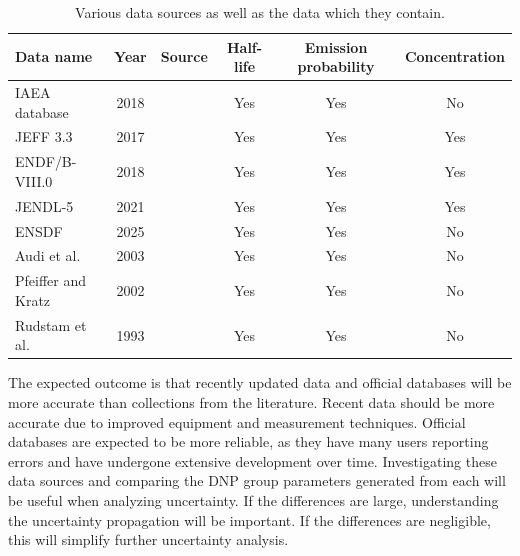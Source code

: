 \begin{table}[H]
    \centering
    \caption{Various data sources as well as the data which they contain.}
    \begin{tabular}{lccccc}
    \hline
    Data name & Year & Source & Half-life & Emission probability & Concentration\\
    \hline
      \gls{IAEA} database & 2018 & \cite{DIMITRIOU2021144} & Yes & Yes & No\\
      \gls{JEFF} 3.3 & 2017 & \cite{plompen2020joint} & Yes & Yes & Yes\\
      \gls{ENDF}/B-VIII.0 & 2018 & \cite{Brown20181} & Yes & Yes & Yes\\
      \gls{JENDL}-5 & 2021 & \cite{iwamoto2023japanese} & Yes & Yes & Yes\\
      \gls{ENSDF} & 2025 & \cite{ensdf} & Yes & Yes & No\\
      Audi et al. & 2003 & \cite{audi2003nubase} & Yes & Yes & No\\
      Pfeiffer and Kratz & 2002 & \cite{pfeiffer2002status} & Yes & Yes & No\\
      Rudstam et al. & 1993& \cite{rudstam1993delayed} & Yes & Yes & No\\
    \hline
    \end{tabular}
    \label{tab:datasources}
\end{table}

The expected outcome is that recently updated data and official databases will be more accurate than collections from the literature.
Recent data should be more accurate due to improved equipment and measurement techniques.
Official databases are expected to be more reliable, as they have many users reporting errors and have undergone extensive development over time.
Investigating these data sources and comparing the \gls{DNP} group parameters generated from each will be useful when analyzing uncertainty.
If the differences are large, understanding the uncertainty propagation will be important.
If the differences are negligible, this will simplify further uncertainty analysis.

